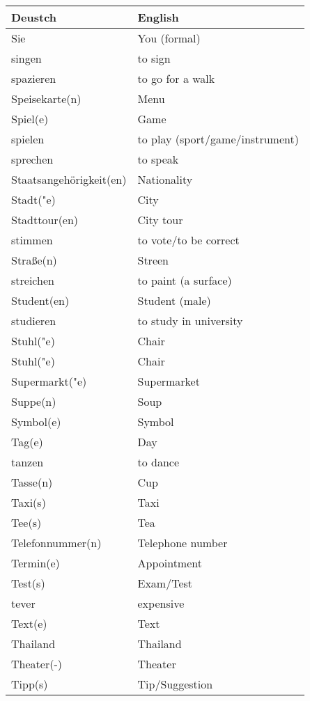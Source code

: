 \documentclass{article}
\renewcommand{\arraystretch}{1}
\begin{document}
\newpage

\begin{minipage}{0.48\textwidth}
    \centering
    \renewcommand{\arraystretch}{1.5}
    \begin{tabular}{|>{\raggedright\arraybackslash}p{3.5cm}|>{\raggedright\arraybackslash}p{3.5cm}|}
        \hline
        \rowcolor{gray!20} \textbf{Deustch} & \textbf{English} \\
        \hline
        Sie & You (formal) \\\hline
        singen & to sign \\\hline
        spazieren & to go for a walk \\\hline
        Speisekarte(n) & Menu \\\hline
        Spiel(e) & Game \\\hline
        spielen & to play (sport/game/instrument) \\\hline
        sprechen & to speak \\\hline
        Staatsangehörigkeit(en) & Nationality \\\hline
        Stadt("e) & City \\\hline
        Stadttour(en) & City tour \\\hline
        stimmen & to vote/to be correct \\\hline
        Stra\ss{}e(n) & Streen \\\hline
        streichen & to paint (a surface) \\\hline
        Student(en) & Student (male) \\\hline
        studieren & to study in university \\\hline
        Stuhl("e) & Chair \\\hline
        Stuhl("e) & Chair \\\hline
        Supermarkt("e) & Supermarket \\\hline
        Suppe(n) & Soup \\\hline
        Symbol(e) & Symbol \\\hline
        Tag(e) & Day \\\hline
        tanzen & to dance \\\hline
        Tasse(n) & Cup \\\hline
        Taxi(s) & Taxi \\\hline
        Tee(s) & Tea \\\hline
        Telefonnummer(n) & Telephone number \\\hline
        Termin(e) & Appointment \\\hline
        Test(s) & Exam/Test \\\hline
        tever & expensive \\\hline
        Text(e) & Text \\\hline
        Thailand & Thailand \\\hline
        Theater(-) & Theater \\\hline
        Tipp(s) & Tip/Suggestion \\\hline
    \end{tabular}
\end{minipage}%
\end{document}
